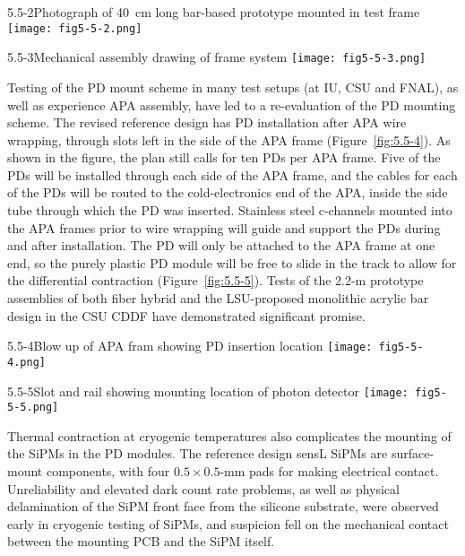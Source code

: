\begin{cdrfigure}{5.5-2}{Photograph of 40~cm long bar-based prototype mounted in test frame}
  \texttt{[image: fig5-5-2.png]}
\end{cdrfigure}


\begin{cdrfigure}{5.5-3}{Mechanical assembly drawing of frame system}
  \texttt{[image: fig5-5-3.png]}
\end{cdrfigure}


Testing of the PD mount scheme in many test setups (at IU, CSU and
FNAL), as well as experience APA assembly, have led to a re-evaluation
of the PD mounting scheme.  The revised reference design has PD installation
after APA wire wrapping, through slots left in the side
of the APA frame (Figure~\ref{fig:5.5-4}).  As shown in the figure, the
plan still calls for ten PDs per APA frame.  Five of the PDs will be
installed through each side of the APA frame, and the cables for each
of the PDs will be routed to the cold-electronics end of the APA,
inside the side tube through which the PD was inserted.  Stainless steel
c-channels mounted into the APA frames prior to wire wrapping will
guide and support the PDs during and after installation.  The PD will
only be attached to the APA frame at one end, so the purely plastic PD
module will be free to slide in the track to allow for the
differential contraction (Figure~\ref{fig:5.5-5}).  Tests of the 2.2-m prototype
assemblies of both fiber hybrid and the LSU-proposed monolithic
acrylic bar design in the CSU CDDF  have demonstrated significant
promise.  %

\begin{cdrfigure}{5.5-4}{Blow up of APA fram showing PD insertion location}
  \texttt{[image: fig5-5-4.png]}
\end{cdrfigure}


\begin{cdrfigure}{5.5-5}{Slot and rail showing mounting location of photon detector}
  \texttt{[image: fig5-5-5.png]}
\end{cdrfigure}


Thermal contraction at cryogenic temperatures also complicates the
mounting of the SiPMs in the PD modules.  The reference design sensL SiPMs are
surface-mount components, with four $0.5\times0.5$-mm pads for making
electrical contact.  Unreliability  and elevated dark count rate
problems, as well as physical delamination of the SiPM front face from
the silicone substrate, were observed early in cryogenic testing of
SiPMs, and suspicion fell on the mechanical contact between the
mounting PCB and the SiPM itself.

